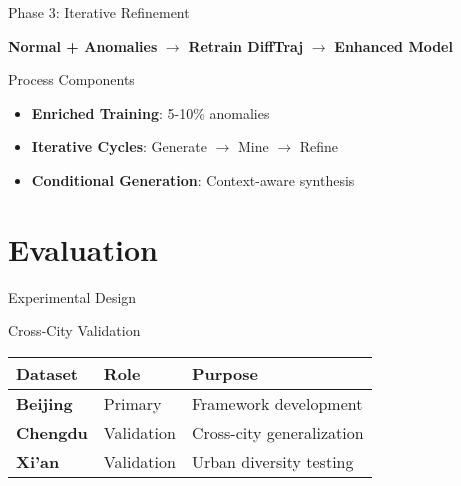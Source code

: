 \documentclass[aspectratio=169,xcolor={dvipsnames}]{beamer}
\begin{document}
\begin{frame}{Phase 3: Iterative Refinement}
  \begin{block}{}
    \centering
    \Large \textbf{Normal + Anomalies} $\rightarrow$ \textbf{Retrain DiffTraj} $\rightarrow$ \textbf{Enhanced Model}
  \end{block}
  
  \vspace{1em}
  \begin{block}{Process Components}
    \begin{itemize}
      \item \textbf{Enriched Training}: 5-10\% anomalies
      \item \textbf{Iterative Cycles}: Generate $\rightarrow$ Mine $\rightarrow$ Refine
      \item \textbf{Conditional Generation}: Context-aware synthesis
    \end{itemize}
  \end{block}
\end{frame}

\section{Evaluation}

\begin{frame}{Experimental Design}
  \begin{block}{Cross-City Validation}
    \begin{table}[h]
      \centering
      \begin{tabular}{lll}
        \toprule
        \textbf{Dataset} & \textbf{Role} & \textbf{Purpose} \\
        \midrule
        \textbf{Beijing} & Primary & Framework development \\
        \textbf{Chengdu} & Validation & Cross-city generalization \\
        \textbf{Xi'an} & Validation & Urban diversity testing \\
        \bottomrule
      \end{tabular}
    \end{table}
  \end{block}
\end{frame}
\end{document}

